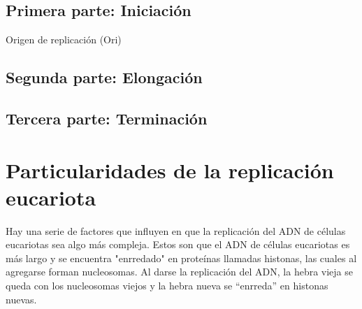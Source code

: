 \subsection{Primera parte: Iniciación}

Origen de replicación (Ori)

\subsection{Segunda parte: Elongación}



\subsection{Tercera parte: Terminación}



\section{Particularidades de la replicación eucariota}

Hay una serie de factores que influyen en que la replicación del ADN de células eucariotas sea algo más compleja. Estos son que el ADN de células eucariotas es más largo y se encuentra "enrredado" en proteínas llamadas histonas, las cuales al agregarse forman nucleosomas. Al darse la replicación del ADN, la hebra vieja se queda con los nucleosomas viejos y la hebra nueva se ``enrreda'' en histonas nuevas.


